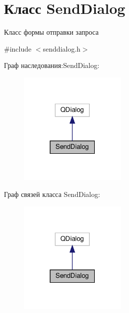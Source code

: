 \hypertarget{classSendDialog}{}\section{Класс Send\+Dialog}
\label{classSendDialog}


Класс формы отправки запроса  




{\ttfamily \#include $<$senddialog.\+h$>$}



Граф наследования\+:Send\+Dialog\+:\nopagebreak
\begin{figure}[H]
\begin{center}
\leavevmode
\includegraphics[width=147pt]{classSendDialog__inherit__graph}
\end{center}
\end{figure}


Граф связей класса Send\+Dialog\+:\nopagebreak
\begin{figure}[H]
\begin{center}
\leavevmode
\includegraphics[width=147pt]{classSendDialog__coll__graph}
\end{center}
\end{figure}
